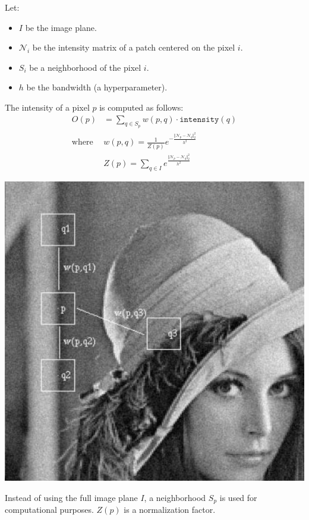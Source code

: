 \begin{description}
        \begin{minipage}{0.75\textwidth}
            Let:
            \begin{itemize}
                \item $I$ be the image plane.
                \item $\mathcal{N}_i$ be the intensity matrix of a patch centered on the pixel $i$.
                \item $S_i$ be a neighborhood of the pixel $i$.
                \item $h$ be the bandwidth (a hyperparameter).
            \end{itemize}
            The intensity of a pixel $p$ is computed as follows:
            \[
                \begin{split}
                    O(p) &= \sum_{q \in S_p} w(p, q) \cdot \texttt{intensity}(q) \\
                    \text{where }& w(p, q) = \frac{1}{Z(p)} e^{-\frac{\Vert \mathcal{N}_p - \mathcal{N}_q \Vert_2^2}{h^2}} \\
                                & Z(p) = \sum_{q \in I} e^{\frac{\Vert \mathcal{N}_p - \mathcal{N}_q \Vert_2^2}{h^2}}
                \end{split}
            \]
        \end{minipage}
        \begin{minipage}{0.25\textwidth}
            \centering
            \includegraphics[width=\linewidth]{./img/non_local_means_filter.png}
        \end{minipage}

        Instead of using the full image plane $I$, a neighborhood $S_p$ is used for computational purposes.
        $Z(p)$ is a normalization factor.
\end{description}